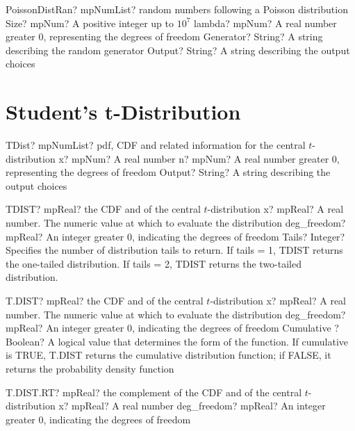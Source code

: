 \documentclass[12pt,a4paper,openany]{book}
\begin{document}
\begin{mpFunctionsExtract}
\mpFunctionFourNotImplemented
{PoissonDistRan? mpNumList? random numbers following a Poisson distribution}
{Size? mpNum? A positive integer up to $10^7$}
{lambda? mpNum? A real number greater 0, representing the degrees of freedom}
{Generator? String? A string describing the random generator}
{Output? String? A string describing the output choices}
\end{mpFunctionsExtract}

\section{Student's t-Distribution}

\begin{mpFunctionsExtract}
\mpFunctionThreeNotImplemented
{TDist? mpNumList? pdf, CDF and related information for the central $t$-distribution}
{x? mpNum? A real number}
{n? mpNum? A real number greater 0, representing the degrees of freedom}
{Output? String? A string describing the output choices}
\end{mpFunctionsExtract}

\begin{mpFunctionsExtract}
\mpWorksheetFunctionThreeNotImplemented
{TDIST? mpReal? the CDF and of the central $t$-distribution}
{x? mpReal? A real number. The numeric value at which to evaluate the distribution}
{deg\_freedom? mpReal? An integer  greater 0, indicating the degrees of freedom}
{Tails? Integer? Specifies the number of distribution tails to return. If tails = 1, TDIST returns the one-tailed distribution. If tails = 2, TDIST returns the two-tailed distribution.}
\end{mpFunctionsExtract}

\begin{mpFunctionsExtract}
\mpWorksheetFunctionThreeNotImplemented
{T.DIST? mpReal? the CDF and of the central $t$-distribution}
{x? mpReal? A real number. The numeric value at which to evaluate the distribution}
{deg\_freedom? mpReal? An integer  greater 0, indicating the degrees of freedom}
{Cumulative ? Boolean? A logical value that determines the form of the function. If cumulative is TRUE, T.DIST returns the cumulative distribution function; if FALSE, it returns the probability density function}
\end{mpFunctionsExtract}

\begin{mpFunctionsExtract}
\mpWorksheetFunctionTwoNotImplemented
{T.DIST.RT? mpReal? the complement of the CDF and of the central $t$-distribution}
{x? mpReal? A real number}
{deg\_freedom? mpReal? An integer  greater 0, indicating the degrees of freedom}
\end{mpFunctionsExtract}
\end{document}

